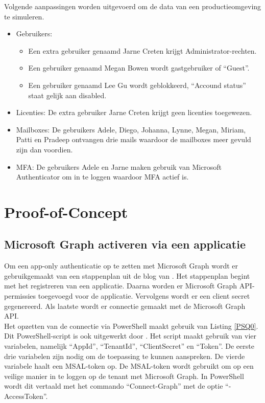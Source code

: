 Volgende aanpassingen worden uitgevoerd om de data van een productieomgeving te simuleren.

\begin{itemize}
    \item Gebruikers: 
    \begin{itemize}
        \item Een extra gebruiker genaamd Jarne Creten krijgt Administrator-rechten.
        \item Een gebruiker genaamd Megan Bowen wordt gastgebruiker of “Guest”.
        \item Een gebruiker genaamd Lee Gu wordt geblokkeerd, “Accound status” staat gelijk aan disabled.
    \end{itemize}
    \item Licenties: De extra gebruiker Jarne Creten krijgt geen licenties toegewezen.
    \item Mailboxes: De gebruikers Adele, Diego, Johanna, Lynne, Megan, Miriam, Patti en Pradeep ontvangen drie mails waardoor de mailboxes meer gevuld zijn dan voordien.
    \item \ac{MFA}: De gebruikers Adele en Jarne maken gebruik van Microsoft Authenticator om in te loggen waardoor \ac{MFA} actief is.
\end{itemize}

\section{Proof-of-Concept}

\subsection{Microsoft Graph activeren via een applicatie}


Om een app-only authenticatie op te zetten met Microsoft Graph wordt er gebruikgemaakt van een stappenplan uit de blog van \textcite{Terlisten2022}. Het stappenplan begint met het registreren van een applicatie. Daarna worden er Microsoft Graph \Ac{API}-permissies toegevoegd voor de applicatie. Vervolgens wordt er een client secret gegenereerd. Als laatste wordt er connectie gemaakt met de Microsoft Graph \Ac{API}. \\

Het opzetten van de connectie via PowerShell maakt gebruik van Listing \ref{PSQ0}. Dit PowerShell-script is ook uitgewerkt door \textcite{Terlisten2022}. Het script maakt gebruik van vier variabelen, namelijk “AppId”, “TenantId”, “ClientSecret” en “Token”. De eerste drie variabelen zijn nodig om de toepassing te kunnen aanspreken. De vierde variabele haalt een \ac{MSAL}-token op. De \ac{MSAL}-token wordt gebruikt om op een veilige manier in te loggen op de tenant met Microsoft Graph. In PowerShell wordt dit vertaald met het commando “Connect-Graph” met de optie “-AccessToken”. \\

